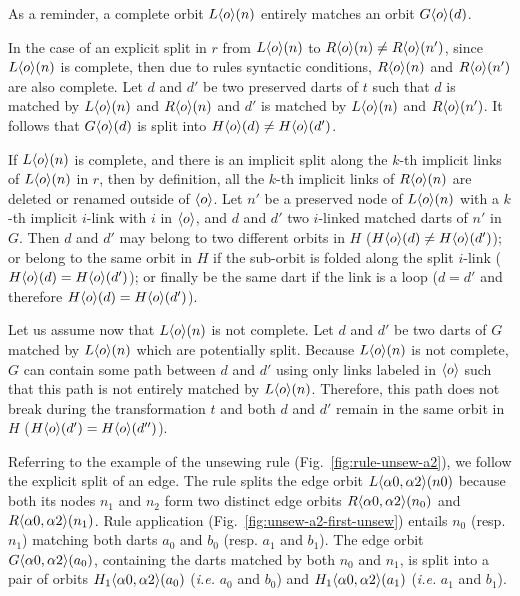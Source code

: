 \begin{proofidea}\label{prfid:orbit-split}
  As a reminder, a complete orbit $L\langle o\rangle(n)$ entirely matches an orbit
  $G\langle o\rangle(d)$.

  In the case of an explicit split in $r$ from $L\langle o\rangle(n)$ to $R\langle o\rangle(n) \neq R\langle o\rangle(n')$, since $L\langle o\rangle(n)$ is complete, then due to rules syntactic conditions, $R\langle o\rangle(n)$ and $R\langle o\rangle(n')$ are also complete.
  Let $d$ and $d'$ be two preserved darts of $t$ such that $d$ is matched by $L\langle o\rangle(n)$ and $R\langle o\rangle(n)$ and $d'$ is matched by $L\langle o\rangle(n)$ and $R\langle o\rangle(n')$.
  It follows that $G\langle o\rangle(d)$ is split into $H\langle o\rangle(d) \neq H\langle o\rangle(d')$.

  If $L\langle o\rangle(n)$ is complete, and there is an implicit split along the $k$-th implicit links of $L\langle o\rangle(n)$ in $r$, then
  by definition, all the $k$-th implicit links of $R\langle o\rangle(n)$ are deleted or renamed outside of $\langle o\rangle$.
  Let $n'$ be a preserved node of $L\langle o\rangle(n)$ with a $k$-th implicit $i$-link with $i$ in $\langle o\rangle$, and $d$ and $d'$ two $i$-linked matched darts of $n'$ in $G$.
  Then $d$ and $d'$ may belong to two different orbits in $H$ ($H\langle o\rangle(d) \neq H\langle o\rangle(d')$); or belong to the same orbit in $H$ if the sub-orbit is folded along the split $i$-link ($H\langle o\rangle(d) = H\langle o\rangle(d')$); or finally be the same dart if the link is a loop ($d = d'$ and therefore $H\langle o\rangle(d) = H\langle o\rangle(d')$).

  Let us assume now that $L\langle o\rangle(n)$ is not complete.
  Let $d$ and $d'$ be two darts of $G$ matched by $L\langle o\rangle(n)$ which are potentially split. %
  Because $L\langle o\rangle(n)$ is not complete, $G$ can contain some path between $d$ and $d'$ using only links labeled in $\langle o\rangle$ such that this path is not entirely matched by $L\langle o\rangle(n)$.
  Therefore, this path does not break during the transformation $t$ and both $d$ and $d'$ remain in the same orbit in $H$ ($H\langle o\rangle(d') = H\langle o\rangle(d'')$).
\end{proofidea}


Referring to the example of the unsewing rule (Fig.~\ref{fig:rule-unsew-a2}), we follow the explicit split of an edge.
The rule splits the edge orbit $L\langle\alpha 0, \alpha 2\rangle(n0)$ because both its nodes $n_{1}$ and $n_{2}$ form two distinct edge orbits $R\langle\alpha 0, \alpha 2\rangle(n_{0})$ and $R\langle\alpha 0, \alpha 2\rangle(n_{1})$.
Rule application (Fig.~\ref{fig:unsew-a2-first-unsew}) entails $n_{0}$ (resp. $n_{1}$) matching both darts $a_{0}$ and $b_{0}$ (resp. $a_{1}$ and $b_{1}$).
The edge orbit $G\langle\alpha 0, \alpha 2\rangle(a_{0})$, containing the darts matched by both $n_{0}$ and $n_{1}$, is split into a pair of orbits $H_1\langle\alpha 0, \alpha 2\rangle(a_{0})$ (\textit{i.e.} $a_{0}$ and $b_{0}$) and $H_1\langle\alpha 0, \alpha 2\rangle(a_{1})$ (\textit{i.e.} $a_{1}$ and $b_{1}$).


